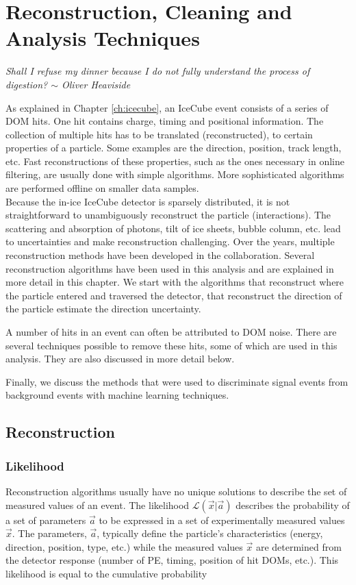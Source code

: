 \chapter{Reconstruction, Cleaning and Analysis Techniques}
\label{ch:reconstruction}
\begin{flushright}
\textit{Shall I refuse my dinner because I do not fully understand the process of digestion? $\sim$ Oliver Heaviside}
\end{flushright}
As explained in Chapter \ref{ch:icecube}, an IceCube event consists of a series of DOM hits. One hit contains charge, timing and positional information. The collection of multiple hits has to be translated (reconstructed), to certain properties of a particle. Some examples are the direction, position, track length, etc. Fast reconstructions of these properties, such as the ones necessary in online filtering, are usually done with simple algorithms. More sophisticated algorithms are performed offline on smaller data samples.\\

\noindent Because the in-ice IceCube detector is sparsely distributed, it is not straightforward to unambiguously reconstruct the particle (interactions). The scattering and absorption of photons, tilt of ice sheets, bubble column, etc. lead to uncertainties and make reconstruction challenging. Over the years, multiple reconstruction methods have been developed in the collaboration. Several reconstruction algorithms have been used in this analysis and are explained in more detail in this chapter. We start with the algorithms that reconstruct where the particle entered and traversed the detector, that reconstruct the direction of the particle estimate the direction uncertainty.

A number of hits in an event can often be attributed to DOM noise. There are several techniques possible to remove these hits, some of which are used in this analysis. They are also discussed in more detail below.

Finally, we discuss the methods that were used to discriminate signal events from background events with machine learning techniques.

\section{Reconstruction}

\subsection{Likelihood}
Reconstruction algorithms usually have no unique solutions to describe the set of measured values of an event. The likelihood $\mathcal{L}(\vec{x} |\vec{a})$ describes the probability of a set of parameters ${\vec{a}}$ to be expressed in a set of experimentally measured values ${\vec{x}}$. The parameters, ${\vec{a}}$, typically define the particle's characteristics (energy, direction, position, type, etc.) while the measured values ${\vec{x}}$ are determined from the detector response (number of PE, timing, position of hit DOMs, etc.). This likelihood is equal to the cumulative probability

